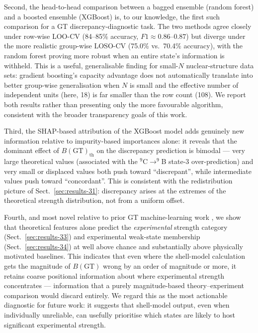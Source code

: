 \documentclass[10pt,twocolumn]{article}
\begin{document}
Second, the head-to-head comparison between a bagged ensemble (random forest) and a boosted ensemble (XGBoost) is, to our knowledge, the first such comparison for a GT discrepancy-diagnostic task. The two methods agree closely under row-wise LOO-CV (84--85\% accuracy, $F1\approx0.86$--$0.87$) but diverge under the more realistic group-wise LOSO-CV (75.0\% vs.\ 70.4\% accuracy), with the random forest proving more robust when an entire state's information is withheld. This is a useful, generalisable finding for small-$N$ nuclear-structure data sets: gradient boosting's capacity advantage does not automatically translate into better group-wise generalisation when $N$ is small and the effective number of independent units (here, 18) is far smaller than the row count (108). We report both results rather than presenting only the more favourable algorithm, consistent with the broader transparency goals of this work.

Third, the SHAP-based attribution of the XGBoost model adds genuinely new information relative to impurity-based importances alone: it reveals that the dominant effect of $B(\mathrm{GT})_{\mathrm{th}}$ on the discrepancy prediction is bimodal --- very large theoretical values (associated with the $^{9}$C$\rightarrow^{9}$B state-3 over-prediction) and very small or displaced values both push toward ``discrepant'', while intermediate values push toward ``concordant''. This is consistent with the redistribution picture of Sect.~\ref{sec:results-31}: discrepancy arises at the extremes of the theoretical strength distribution, not from a uniform offset.

Fourth, and most novel relative to prior GT machine-learning work \cite{ref8}, we show that theoretical features alone predict the \emph{experimental} strength category (Sect.~\ref{sec:results-33}) and experimental weak-state membership (Sect.~\ref{sec:results-34}) at well above chance and substantially above physically motivated baselines. This indicates that even where the shell-model calculation gets the magnitude of $B(\mathrm{GT})$ wrong by an order of magnitude or more, it retains coarse positional information about where experimental strength concentrates --- information that a purely magnitude-based theory--experiment comparison would discard entirely. We regard this as the most actionable diagnostic for future work: it suggests that shell-model output, even when individually unreliable, can usefully prioritise which states are likely to host significant experimental strength.
\end{document}
